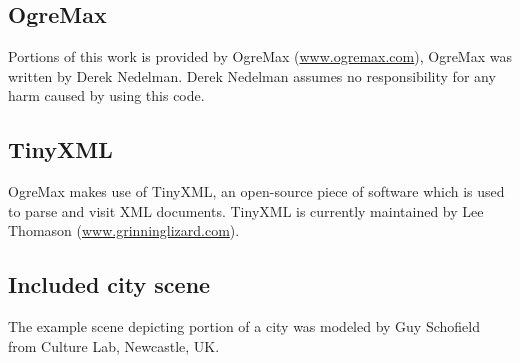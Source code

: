     \subsection{OgreMax}
        
        Portions of this work is provided by OgreMax (\href{http://www.ogremax.com}{www.ogremax.com}), OgreMax was written by Derek Nedelman. Derek Nedelman assumes no responsibility for any harm caused by using this code.
        
    \subsection{TinyXML}
    
        OgreMax makes use of TinyXML, an open-source piece of software which is used to parse and visit XML documents. TinyXML is currently maintained by Lee Thomason (\href{http://www.grinninglizard.com}{www.grinninglizard.com}).

    \subsection{Included city scene}

    The example scene depicting portion of a city was modeled by Guy Schofield from Culture Lab, Newcastle, UK.
    
